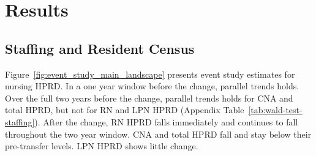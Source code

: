 \documentclass[12pt]{article}
\begin{document}
\section{Results} \label{sec:results}

\subsection{Staffing and Resident Census}

Figure~\ref{fig:event_study_main_landscape} presents event study estimates for nursing HPRD. In a one year window before the change, parallel trends holds. Over the full two years before the change, parallel trends holds for CNA and total HPRD, but not for RN and LPN HPRD (Appendix Table~\ref{tab:wald-test-staffing}). After the change, RN HPRD falls immediately and continues to fall throughout the two year window. CNA and total HPRD fall and stay below their pre-transfer levels. LPN HPRD shows little change.

\end{document}
